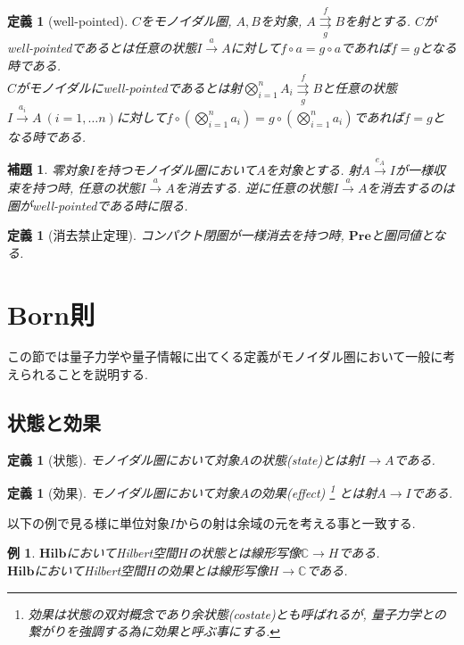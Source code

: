 \documentclass[a4paper,12pt]{ltjsarticle}
\theoremstyle{break}
\newtheorem{defn}[thm]{定義}
\newtheorem{eg}[thm]{例}
\newtheorem{lem}[thm]{補題}
\newcommand{\hilb}{\mathbf{Hilb}}
\newcommand{\pre}{\mathbf{Pre}}
\newcommand{\mbc}{\mathbb{C}}
\newcommand{\xr}[1]{\xrightarrow{#1}}
\newcommand{\ci}{\circ}
\newcommand{\bigot}{\bigotimes}
\numberwithin{equation}{section}
\begin{document}
\begin{defn}[well-pointed]
  $C$をモノイダル圏, $A,B$を対象, $A \overset{f}{\underset{g}{\rightrightarrows}} B$を射とする. 
  $C$がwell-pointedであるとは任意の状態$I \xr{a} A$に対して$f \ci a=g \ci a$であれば$f=g$となる時である. \\
  $C$がモノイダルにwell-pointedであるとは射$\bigot_{i=1}^{n} A_i \overset{f}{\underset{g}{\rightrightarrows}} B$と任意の状態$I \xr{a_i} A ~(i=1,\dots n)$に対して$f \ci \left( \bigot_{i=1}^{n} a_i \right)=g \ci \left( \bigot_{i=1}^{n} a_i \right)$であれば$f=g$となる時である. 
\end{defn}

\begin{lem}
  零対象$I$を持つモノイダル圏において$A$を対象とする. 
  射$A \xr{e_A} I$が一様収束を持つ時, 任意の状態$I \xr{a} A$を消去する. 
  逆に任意の状態$I \xr{a} A$を消去するのは圏がwell-pointedである時に限る. 
\end{lem}

\begin{defn}[消去禁止定理]
  コンパクト閉圏が一様消去を持つ時, $\pre$と圏同値となる. 
\end{defn}

\newpage

\section{Born則}

この節では量子力学や量子情報に出てくる定義がモノイダル圏において一般に考えられることを説明する. 

\subsection{状態と効果}

\begin{defn}[状態]
  モノイダル圏において対象$A$の状態(state)とは射$I \to A$である. 
\end{defn} 

\begin{defn}[効果]
  モノイダル圏において対象$A$の効果(effect)
  \footnote{
    効果は状態の双対概念であり余状態(costate)とも呼ばれるが, 量子力学との繋がりを強調する為に効果と呼ぶ事にする.
    }
  とは射$A \to I$である. 
\end{defn}  

以下の例で見る様に単位対象$I$からの射は余域の元を考える事と一致する. 

\begin{eg}
  $\hilb$においてHilbert空間$H$の状態とは線形写像$\mbc \to H$である. \\ 
  $\hilb$においてHilbert空間$H$の効果とは線形写像$H \to \mbc$である. 
\end{eg}
\end{document}

